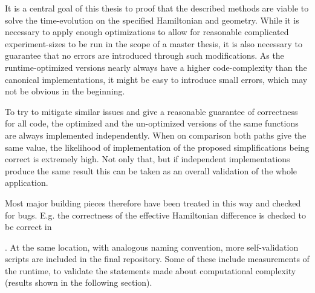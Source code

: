 It is a central goal of this thesis to proof that the described methods are viable to solve the time-evolution on the specified Hamiltonian and geometry.
While it is necessary to apply enough optimizations to allow for reasonable complicated experiment-sizes to be run in the scope of a master thesis, it is also necessary to guarantee that no errors are introduced through such modifications.
As the runtime-optimized versions nearly always have a higher code-complexity than the canonical implementations, it might be easy to introduce small errors, which may not be obvious in the beginning.

To try to mitigate similar issues and give a reasonable guarantee of correctness for all code, the optimized and the un-optimized versions of the same functions are always implemented independently.
When on comparison both paths give the same value, the likelihood of implementation of the proposed simplifications being correct is extremely high.
Not only that, but if independent implementations produce the same result this can be taken as an overall validation of the whole application.

Most major building pieces therefore have been treated in this way and checked for bugs.
E.g. the correctness of the effective Hamiltonian difference is checked to be correct in 

.
At the same location, with analogous naming convention, more self-validation scripts are included in the final repository.
Some of these include measurements of the runtime, to validate the statements made about computational complexity (results shown in the following section).
